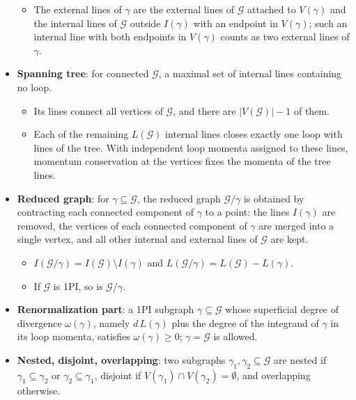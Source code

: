 \documentclass[11pt,a4paper,oneside]{report}
\begin{document}
\begin{CJK*}{UTF8}{gbsn}
\begin{itemize}
\begin{itemize}
\item The external lines of $\gamma$ are the external lines of $\mathcal G$ attached to $V(\gamma)$ and the internal lines of $\mathcal G$ outside $I(\gamma)$ with an endpoint in $V(\gamma)$; such an internal line with both endpoints in $V(\gamma)$ counts as two external lines of $\gamma$.
\end{itemize}


\item \textbf{\boldmath Spanning tree}: for connected $\mathcal G$, a maximal set of internal lines containing no loop.
\begin{itemize}


\item Its lines connect all vertices of $\mathcal G$, and there are $|V(\mathcal G)|-1$ of them.

\item Each of the remaining $L(\mathcal G)$ internal lines closes exactly one loop with lines of the tree. With independent loop momenta assigned to these lines, momentum conservation at the vertices fixes the momenta of the tree lines.
\end{itemize}


\item \textbf{\boldmath Reduced graph}: for $\gamma\subseteq\mathcal G$, the reduced graph $\mathcal G/\gamma$ is obtained by contracting each connected component of $\gamma$ to a point: the lines $I(\gamma)$ are removed, the vertices of each connected component of $\gamma$ are merged into a single vertex, and all other internal and external lines of $\mathcal G$ are kept.
\begin{itemize}


\item $I(\mathcal G/\gamma)=I(\mathcal G)\setminus I(\gamma)$ and $L(\mathcal G/\gamma)=L(\mathcal G)-L(\gamma)$.

\item If $\mathcal G$ is 1PI, so is $\mathcal G/\gamma$.
\end{itemize}


\item \textbf{\boldmath Renormalization part}: a 1PI subgraph $\gamma\subseteq\mathcal G$ whose superficial degree of divergence $\omega(\gamma)$, namely $d\,L(\gamma)$ plus the degree of the integrand of $\gamma$ in its loop momenta, satisfies $\omega(\gamma)\ge0$; $\gamma=\mathcal G$ is allowed.

\item \textbf{\boldmath Nested, disjoint, overlapping}: two subgraphs $\gamma_1,\gamma_2\subseteq\mathcal G$ are nested if $\gamma_1\subseteq\gamma_2$ or $\gamma_2\subseteq\gamma_1$, disjoint if $V(\gamma_1)\cap V(\gamma_2)=\emptyset$, and overlapping otherwise.


\end{itemize}
\end{CJK*}
\end{document}
